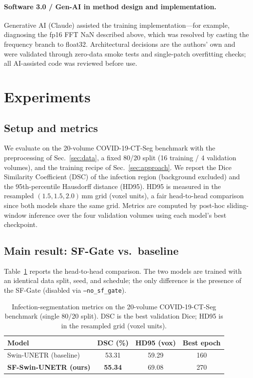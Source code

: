 \documentclass{article}
\begin{document}
\paragraph{Software 3.0 / Gen-AI in method design and implementation.}
Generative AI (Claude) assisted the training implementation---for example, diagnosing the fp16 FFT NaN described above, which was resolved by casting the frequency branch to float32. Architectural decisions are the authors' own and were validated through zero-data smoke tests and single-patch overfitting checks; all AI-assisted code was reviewed before use.

\section{Experiments}
\label{sec:experiments}

\subsection{Setup and metrics}

We evaluate on the 20-volume COVID-19-CT-Seg benchmark with the preprocessing of Sec.~\ref{sec:data}, a fixed 80/20 split (16 training / 4 validation volumes), and the training recipe of Sec.~\ref{sec:approach}. We report the Dice Similarity Coefficient (DSC) of the infection region (background excluded) and the 95th-percentile Hausdorff distance (HD95). HD95 is measured in the resampled $(1.5,1.5,2.0)$\,mm grid (voxel units), a fair head-to-head comparison since both models share the same grid. Metrics are computed by post-hoc sliding-window inference over the four validation volumes using each model's best checkpoint.

\subsection{Main result: SF-Gate vs.\ baseline}

Table~\ref{tab:comparison} reports the head-to-head comparison. The two models are trained with an identical data split, seed, and schedule; the only difference is the presence of the SF-Gate (disabled via \texttt{--no\_sf\_gate}).

\begin{table}[!htbp]
  \caption{Infection-segmentation metrics on the 20-volume COVID-19-CT-Seg benchmark (single 80/20 split). DSC is the best validation Dice; HD95 is in the resampled grid (voxel units).}
  \label{tab:comparison}
  \centering
  \begin{tabular}{lccc}
    \toprule
    \textbf{Model} & \textbf{DSC (\%)} & \textbf{HD95 (vox)} & \textbf{Best epoch} \\
    \midrule
    Swin-UNETR (baseline)          & 53.31 & 59.29 & 160 \\
    \textbf{SF-Swin-UNETR (ours)}  & \textbf{55.34} & 69.08 & 270 \\
    \bottomrule
  \end{tabular}
\end{table}
\end{document}
